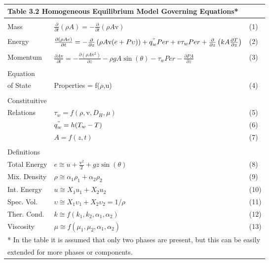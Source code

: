 \documentclass[12pt,fleqn]{report}
\begin{document}
{\newpage
\clearpage
\samepage \begin{tabular}{*{3}{l}}
\multicolumn{3}{l}{\bf Table 3.2  Homogeneous Equilibrium Model Governing Equations*} \\ [5mm] \hline
  &   &  \\ 
Mass & $\frac{\partial}{\partial t} \left( \rho A \right) = - \frac{\partial}{\partial t} \left( \rho A \mbox{v} \right)$ & (1)\\ 
   &  &   \\ 
Energy & $\frac{\partial \left( \rho Ae \right)}{\partial t} = -\frac{\partial}{\partial z} \left( \rho A\mbox{v}(e+P\upsilon) \right) + q_{w}^{"}Per + v\tau_{w}Per +  \frac{\partial}{\partial z} \left( kA \frac{\partial T}{\partial z} \right)$ & (2)\\ 
    &   &  \\ 
Momentum & $\frac{\partial A\mbox{v}}{\partial t} = - \frac{\partial \left( \rho A \mbox{v}^{2} \right)}{\partial z} - \rho g A \sin(\theta) - \tau_{w}Per - \frac{\partial PA}{\partial z}$ & (3)\\ 
 & & \\ 
Equation &  & \\ 
of State & Properties = f($\rho$,u) & (4)\\ 
  & &  \\ 
Constituitive & & \\ 
Relations  & $\tau_{w}  =  f(\rho,\mbox{v},D_{H},\mu)$ & (5)\\ 
           & $q_{w}^{"} = h(T_{w} - T)$ & (6)\\ 
           & $A  = f(z,t)$ & (7)\\ 
  &  &  \\ 
Definitions & & \\ 
Total Energy & $e\cong u + \frac{\mbox{v}^{2}}{2} + gz\sin(\theta)$ & (8)\\ 
Mix. Density & $\rho\cong \alpha_{1}\rho_{1} + \alpha_{2}\rho_{2}$ & (9)\\ 
Int. Energy & $u\cong X_{1}u_{1} + X_{2}u_{2}$ & (10)\\ 
Spec. Vol. & $\upsilon\cong X_{1}\upsilon_{1} + X_{2}\upsilon_{2}  = 1/\rho$ & (11)\\ 
Ther. Cond. & $k\cong f(k_{1},k_{2},\alpha_{1},\alpha_{2})$ & (12)\\ 
Viscosity & $\mu\cong f(\mu_{1},\mu_{2},\alpha_{1},\alpha_{2})$ & (13)\\  [5mm] \hline
\multicolumn{3}{l}{* In the table it is assumed that only two phases are present, but this can be easily}\\ 
\multicolumn{3}{l}{\hspace{2mm} extended for more phases or components.}
\end{tabular}
}
\end{document}
